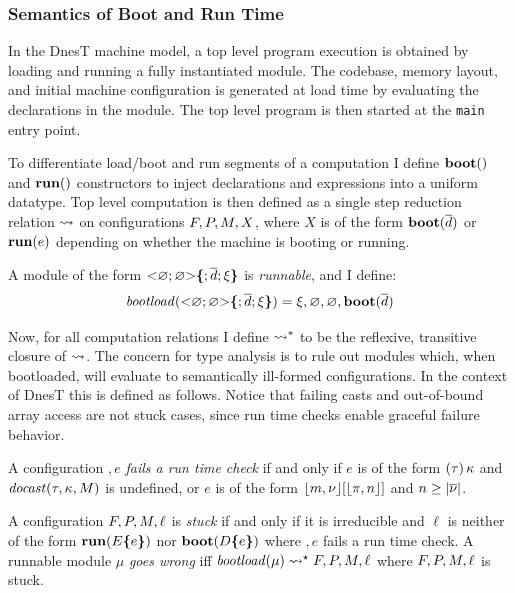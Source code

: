 \declsemanticsfig

\subsubsection{Semantics of Boot and Run Time}

In the DnesT machine model, a top level program execution is obtained by loading and running a
fully instantiated module. The codebase, memory layout, and initial machine configuration is
generated at load time by evaluating the declarations in the module. The top level program is
then started at the \texttt{main} entry point.

To differentiate load/boot and run segments of a computation I define $\mathbf{boot}()$ and
$\mathbf{run}()$ constructors to inject declarations and expressions into a uniform datatype. Top
level computation is then defined as a single step reduction relation $\leadsto$ on
configurations $F,P,M,X$, where $X$ is of the form $\mathbf{boot}(\overline{d})$ or
$\mathbf{run}(e)$ depending on whether the machine is booting or running.

\begin{definition}
  A module of the form $\mathrm{<}\varnothing; \varnothing \mathrm{>}\textup{\textbf{\{}} ; \overline{d}; \xi\textup{\textbf{\}}}$ is
  \emph{runnable}, and I define:
$$
\mathit{bootload}(\mathrm{<}\varnothing; \varnothing \mathrm{>}\textup{\textbf{\{}} ; \overline{d}; \xi\textup{\textbf{\}}}) =
\xi,\varnothing,\varnothing, \mathbf{boot}(\overline{d})
$$
\end{definition}

Now, for all computation relations I define $\leadsto^*$ to be the reflexive, transitive closure
of $\leadsto$. The concern for type analysis is to rule out modules which, when bootloaded, will
evaluate to semantically ill-formed configurations. In the context of DnesT this is defined as
follows. Notice that failing casts and out-of-bound array access are not stuck cases, since run
time checks enable graceful failure behavior.
\begin{definition}
  A configuration $\bm, e$ \emph{fails a run time check} if and only if $e$ is of the form
  $(\tau)\,\kappa$ and $\mathit{docast}(\tau,\kappa,M)$ is undefined, or $e$ is of the form
  $\lfloor m,{\nu} \rfloor[\lfloor \pi,n \rfloor]$ and $n\ge|\overline{{\nu}}|$.
\end{definition}

\begin{definition}
  \label{def-runnable-semantics}
  A configuration $F, P, M, \ell$ is \emph{stuck} if and only if it is irreducible
  and $\ell$ is neither of the form $\mathbf{run}(E\textup{\textbf{\{}} e\textup{\textbf{\}}})$ nor $\mathbf{boot}(D\textup{\textbf{\{}} e\textup{\textbf{\}}})$
  where $\bm, e$ fails a run time check. A runnable module $\mu$ \emph{goes wrong} iff
  $\mathit{bootload}(\mu) \leadsto^\star F, P, M, \ell $ where $F, P, M, \ell$
  is stuck.
\end{definition}

